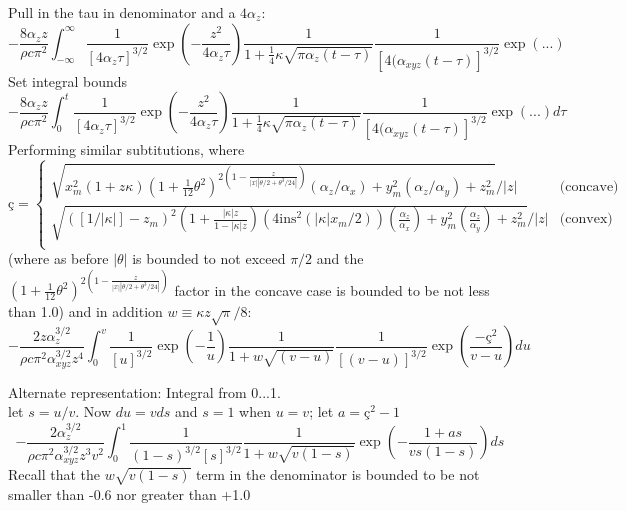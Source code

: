 \documentclass[letterpaper]{article}
\newcommand{\cedilla}{\text{\c{c}}}
\begin{document}
Pull in the tau in denominator and a $4 \alpha_{z}$: 
\begin{equation}
-\frac{8\alpha_{z}z}{\rho c\pi^{2}} \int_{-\infty}^{\infty}\frac{1}{\left[4\alpha_{z}\tau\right]^{3/2}}\exp\left(-\frac{z^{2}}{4\alpha_{z}\tau}\right)\frac{1}{1+\frac{1}{4}\kappa \sqrt{\pi\alpha_{z}(t-\tau)}}\frac{1}{\left[4(\alpha_{xyz}(t-\tau)\right]^{3/2}}\exp\left( ... \right)
\end{equation}
Set integral bounds
\begin{equation}
-\frac{8\alpha_{z}z}{\rho c\pi^{2}} \int_{0}^{t}\frac{1}{\left[4\alpha_{z}\tau\right]^{3/2}}\exp\left(-\frac{z^{2}}{4\alpha_{z}\tau}\right)\frac{1}{1+\frac{1}{4}\kappa \sqrt{\pi\alpha_{z}(t-\tau)}}\frac{1}{\left[4(\alpha_{xyz}(t-\tau)\right]^{3/2}}\exp\left( ... \right) d\tau
\end{equation}
Performing similar subtitutions,
where
\begin{equation}
  \cedilla=\begin{cases}
  \sqrt{x_{m}^{2}(1 + z\kappa)\left(1+\frac{1}{12}\theta^{2}\right)^{2\left(1-\frac{z}{|x||\theta/2 + \theta^{3}/24|}\right)}(\alpha_{z}/\alpha_{x})+y_{m}^{2}(\alpha_{z}/\alpha_{y})+z_{m}^{2}}/|z| & \mbox{(concave)} \\
  \sqrt{(\left[1/|\kappa|\right] - z_{m})^{2}\left(1+\frac{|\kappa| z}{1-|\kappa| z}\right)\left(4\mbox{ins}^{2}(|\kappa|x_{m}/2)\right)(\frac{\alpha_{z}}{\alpha_{x}})+y_{m}^{2}(\frac{\alpha_{z}}{\alpha_{y}})+z_{m}^{2}}/|z| & \mbox{(convex)} \\
  \end{cases}
  \end{equation}
(where as before $|\theta|$ is bounded to not exceed $\pi/2$ and the $\left(1+\frac{1}{12}\theta^{2}\right)^{2\left(1-\frac{z}{|x||\theta/2 + \theta^{3}/24|}\right)}$ factor in the concave case is bounded to be not less than 1.0)
and in  addition
$w \equiv \kappa z \sqrt{\pi}/8$:
\begin{equation}
-\frac{2 z\alpha_{z}^{3/2}}{\rho c\pi^{2}\alpha_{xyz}^{3/2}z^{4}} \int_{0}^{v}\frac{1}{\left[u\right]^{3/2}}\exp\left(-\frac{1}{u}\right)\frac{1}{1+w \sqrt{(v-u)}}\frac{1}{\left[(v-u)\right]^{3/2}}\exp\left(\frac{-\cedilla^{2}}{v-u}\right) du
\end{equation}

Alternate representation: Integral from 0...1.\\
let $s=u/v$. Now $du = v ds$ and $s=1$ when $u=v$; let $a=\cedilla^{2}-1$
\begin{equation}
-\frac{2 \alpha_{z}^{3/2}}{\rho c\pi^{2}\alpha_{xyz}^{3/2}z^{3}v^{2}} \int_{0}^{1}\frac{1}{(1-s)^{3/2}\left[s\right]^{3/2}}\frac{1}{1+w \sqrt{v(1-s)}}\exp\left(-\frac{1 + as}{vs(1-s)}\right) ds
\end{equation}
Recall that the $w\sqrt{v(1-s)}$ term in the denominator is bounded to be not smaller than -0.6 nor greater than +1.0
\end{document}
